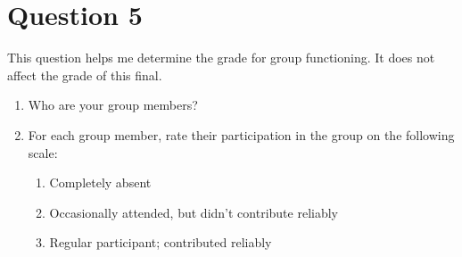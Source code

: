 \documentclass[10pt]{article}
\begin{document}
\newpage
\section{Question 5}

This question helps me determine the grade for group functioning.  It does not affect the grade of this final.

\begin{enumerate}
\item Who are your group members?
\item For each group member, rate their participation in the group on the following scale:
  \begin{enumerate}
  \item Completely absent
  \item Occasionally attended, but didn't contribute reliably
  \item Regular participant; contributed reliably
  \end{enumerate}
\end{enumerate}
\end{document}
